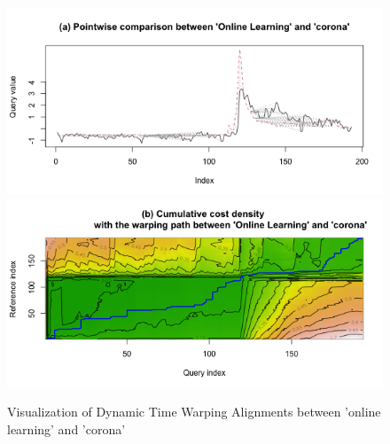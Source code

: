 \documentclass[11pt,a4paper,]{article}
\begin{document}
\begin{figure}[h]

{\centering \includegraphics[width=1\textwidth]{figure/dtw1-1} \includegraphics[width=1\textwidth]{figure/dtw1-2} 

}

\caption{Visualization of Dynamic Time Warping Alignments between 'online learning' and 'corona'}\label{fig:dtw1}
\end{figure}
\end{document}
